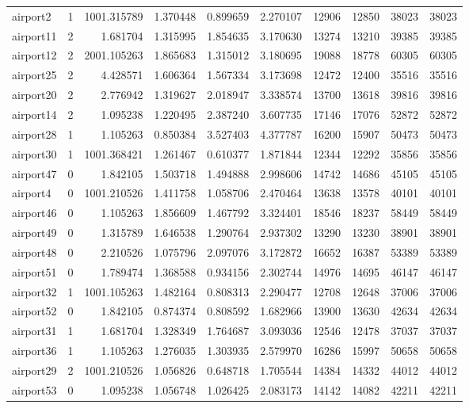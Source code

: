 \begin{longtable}{|l|r|r|r|r|r|r|r|r|r|}
airport2 & 1 & 1001.315789 & 1.370448 & 0.899659 & 2.270107 & 12906 & 12850 & 38023 & 38023 \\
airport11 & 2 & 1.681704 & 1.315995 & 1.854635 & 3.170630 & 13274 & 13210 & 39385 & 39385 \\
airport12 & 2 & 2001.105263 & 1.865683 & 1.315012 & 3.180695 & 19088 & 18778 & 60305 & 60305 \\
airport25 & 2 & 4.428571 & 1.606364 & 1.567334 & 3.173698 & 12472 & 12400 & 35516 & 35516 \\
airport20 & 2 & 2.776942 & 1.319627 & 2.018947 & 3.338574 & 13700 & 13618 & 39816 & 39816 \\
airport14 & 2 & 1.095238 & 1.220495 & 2.387240 & 3.607735 & 17146 & 17076 & 52872 & 52872 \\
airport28 & 1 & 1.105263 & 0.850384 & 3.527403 & 4.377787 & 16200 & 15907 & 50473 & 50473 \\
airport30 & 1 & 1001.368421 & 1.261467 & 0.610377 & 1.871844 & 12344 & 12292 & 35856 & 35856 \\
airport47 & 0 & 1.842105 & 1.503718 & 1.494888 & 2.998606 & 14742 & 14686 & 45105 & 45105 \\
airport4 & 0 & 1001.210526 & 1.411758 & 1.058706 & 2.470464 & 13638 & 13578 & 40101 & 40101 \\
airport46 & 0 & 1.105263 & 1.856609 & 1.467792 & 3.324401 & 18546 & 18237 & 58449 & 58449 \\
airport49 & 0 & 1.315789 & 1.646538 & 1.290764 & 2.937302 & 13290 & 13230 & 38901 & 38901 \\
airport48 & 0 & 2.210526 & 1.075796 & 2.097076 & 3.172872 & 16652 & 16387 & 53389 & 53389 \\
airport51 & 0 & 1.789474 & 1.368588 & 0.934156 & 2.302744 & 14976 & 14695 & 46147 & 46147 \\
airport32 & 1 & 1001.105263 & 1.482164 & 0.808313 & 2.290477 & 12708 & 12648 & 37006 & 37006 \\
airport52 & 0 & 1.842105 & 0.874374 & 0.808592 & 1.682966 & 13900 & 13630 & 42634 & 42634 \\
airport31 & 1 & 1.681704 & 1.328349 & 1.764687 & 3.093036 & 12546 & 12478 & 37037 & 37037 \\
airport36 & 1 & 1.105263 & 1.276035 & 1.303935 & 2.579970 & 16286 & 15997 & 50658 & 50658 \\
airport29 & 2 & 1001.210526 & 1.056826 & 0.648718 & 1.705544 & 14384 & 14332 & 44012 & 44012 \\
airport53 & 0 & 1.095238 & 1.056748 & 1.026425 & 2.083173 & 14142 & 14082 & 42211 & 42211 \\

\end{longtable}
